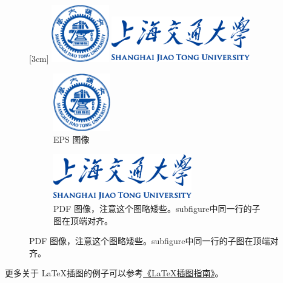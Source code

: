 \documentclass[doctor,openright,twoside]{sjtuthesis}
\theoremstyle{plain}
\theoremstyle{definition}
\theoremstyle{remark}
\theoremstyle{ocrenumbox}
\theoremstyle{plain}
\begin{document}
\begin{figure}[!htp]
  \centering
  [3cm] %
    {\includegraphics[height=2.5cm]{example/sjtulogo.eps}}
  \hspace{4em}
    {\includegraphics[height=2cm]{sjtulogo.pdf}}
  \label{fig:pdfeps-subcaptionbox}
\end{figure}

\begin{figure}[!htp]
  \centering
  \begin{subfigure}{2.5cm}
    \centering
    \includegraphics[height=2.5cm]{example/sjtulogo.eps}
    \caption{EPS 图像}
  \end{subfigure}
  \hspace{4em}
  \begin{subfigure}{0.4\textwidth}
    \centering
    \includegraphics[height=2cm]{sjtulogo.pdf}
    \caption{PDF 图像，注意这个图略矮些。subfigure中同一行的子图在顶端对齐。}
  \end{subfigure}
  \label{fig:pdfeps-subfigure}
\end{figure}

更多关于
\LaTeX 插图的例子可以参考\href{http://www.cs.duke.edu/junhu/Graphics3.pdf}{《\LaTeX 插图指南》}。
\end{document}
